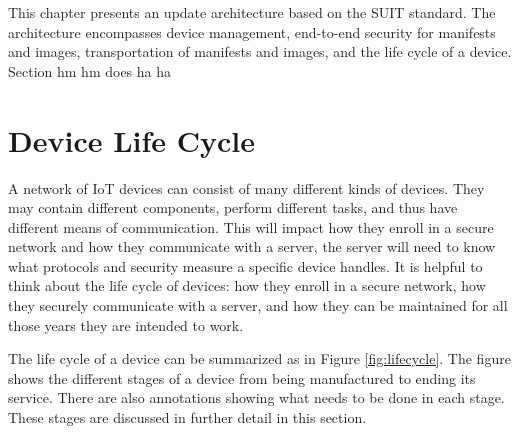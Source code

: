\documentclass[0-thesis.tex]{subfiles}
\begin{document}
This chapter presents an update architecture based on the SUIT standard. The architecture
encompasses device management, end-to-end security for manifests and images,
transportation of manifests and images, and the life cycle of a device. Section hm hm does
ha ha

\section{Device Life Cycle}
\label{sec:device-lifecycle}
A network of IoT devices can consist of many different kinds of devices. They may contain
different components, perform different tasks, and thus have different means of
communication. This will impact how they enroll in a secure network and how they
communicate with a server, the server will need to know what protocols and security
measure a specific device handles. It is helpful to think about the life cycle of devices:
how they enroll in a secure network, how they securely communicate with a server, and how
they can be maintained for all those years they are intended to work.

The life cycle of a device can be summarized as in Figure \ref{fig:lifecycle}. The figure
shows the different stages of a device from being manufactured to ending its service.
There are also annotations showing what needs to be done in each stage. These stages are
discussed in further detail in this section.
\end{document}
